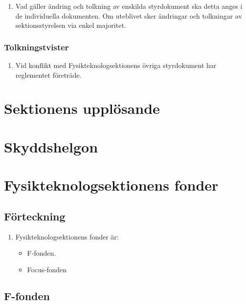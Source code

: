 \documentclass[11pt,a4paper]{article}
\begin{document}
\begin{enumerate}[\thesubsection .1]
\item Vad gäller ändring och tolkning av enskilda styrdokument ska detta anges i de individuella dokumenten. Om uteblivet sker ändringar och tolkningar av sektionsstyrelsen via enkel majoritet. 

\end{enumerate}

\subsubsection{Tolkningstvister}

\begin{enumerate}[\thesubsection .1]

  \item Vid konflikt med Fysikteknologsektionens övriga styrdokument har reglementet företräde.

\end{enumerate}


\newpage

\section{Sektionens upplösande}
\section{Skyddshelgon}


\section{Fysikteknologsektionens fonder}

\subsection{Förteckning}

\begin{enumerate}[\thesubsection .1]
  \item Fysikteknologsektionens fonder är:
    \begin{itemize}
      \item F-fonden.
	  \item Focus-fonden
    \end{itemize}
\end{enumerate}

\subsection{F-fonden}
\end{document}
